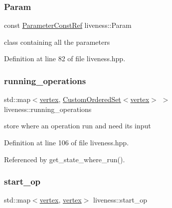 \subsubsection{\texorpdfstring{Param}{Param}}
{\footnotesize\ttfamily const \hyperlink{Parameter_8hpp_a37841774a6fcb479b597fdf8955eb4ea}{Parameter\+Const\+Ref} liveness\+::\+Param\hspace{0.3cm}{\ttfamily [private]}}



class containing all the parameters 



Definition at line 82 of file liveness.\+hpp.

\mbox{\label{classliveness_ab36352fe1ee3f7dbd623241db60c625e}} 
\subsubsection{\texorpdfstring{running\+\_\+operations}{running\_operations}}
{\footnotesize\ttfamily std\+::map$<$\hyperlink{graph_8hpp_abefdcf0544e601805af44eca032cca14}{vertex}, \hyperlink{classCustomOrderedSet}{Custom\+Ordered\+Set}$<$\hyperlink{graph_8hpp_abefdcf0544e601805af44eca032cca14}{vertex}$>$ $>$ liveness\+::running\+\_\+operations\hspace{0.3cm}{\ttfamily [private]}}



store where an operation run and need its input 



Definition at line 106 of file liveness.\+hpp.



Referenced by get\+\_\+state\+\_\+where\+\_\+run().

\mbox{\label{classliveness_a7902dde24769965a1d02782faed9bdd2}} 
\subsubsection{\texorpdfstring{start\+\_\+op}{start\_op}}
{\footnotesize\ttfamily std\+::map$<$\hyperlink{graph_8hpp_abefdcf0544e601805af44eca032cca14}{vertex}, \hyperlink{graph_8hpp_abefdcf0544e601805af44eca032cca14}{vertex}$>$ liveness\+::start\+\_\+op}



